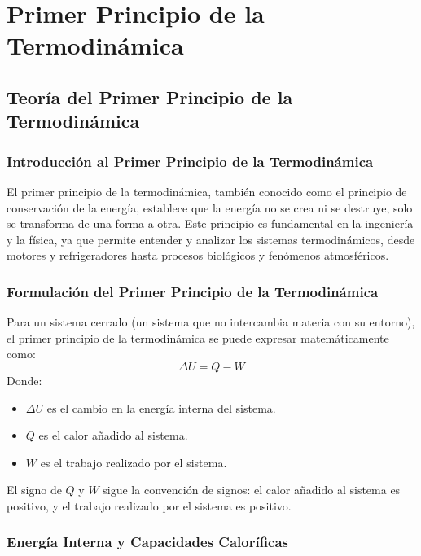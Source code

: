 \documentclass[../main]{subfiles}
\begin{document}
\chapter{Primer Principio de la Termodinámica}

\section{Teoría del Primer Principio de la Termodinámica}

\subsection{Introducción al Primer Principio de la Termodinámica}

El primer principio de la termodinámica, también conocido como el principio de conservación de la energía, establece que la energía no se crea ni se destruye, solo se transforma de una forma a otra. Este principio es fundamental en la ingeniería y la física, ya que permite entender y analizar los sistemas termodinámicos, desde motores y refrigeradores hasta procesos biológicos y fenómenos atmosféricos.

\subsection{Formulación del Primer Principio de la Termodinámica}

Para un sistema cerrado (un sistema que no intercambia materia con su entorno), el primer principio de la termodinámica se puede expresar matemáticamente como:
\begin{equation}
\Delta U = Q - W
\end{equation}
Donde:
\begin{itemize}
    \item $\Delta U$ es el cambio en la energía interna del sistema.
    \item $Q$ es el calor añadido al sistema.
    \item $W$ es el trabajo realizado por el sistema.
\end{itemize}

El signo de $Q$ y $W$ sigue la convención de signos: el calor añadido al sistema es positivo, y el trabajo realizado por el sistema es positivo.

\subsection{Energía Interna y Capacidades Caloríficas}
\end{document}
